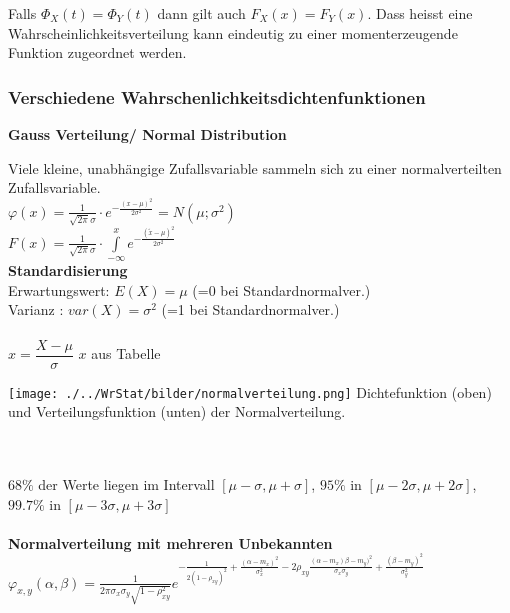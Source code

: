 		Falls $\Phi_X(t) = \Phi_Y(t)$ dann gilt auch $F_X(x)=F_Y(x)$. Dass heisst eine Wahrscheinlichkeitsverteilung kann eindeutig zu einer momenterzeugende Funktion zugeordnet werden.
		
		
			
	\subsubsection{Verschiedene Wahrschenlichkeitsdichtenfunktionen}
		\textbf{Gauss Verteilung/ Normal Distribution}\\
 		\begin{minipage}{10cm}
		Viele kleine, unabhängige Zufallsvariable sammeln sich zu einer
		normalverteilten Zufallsvariable.\\
		 $\varphi(x)=\frac{1}{\sqrt{2
		\pi}\sigma}\cdot e^{-\frac{(x-\mu)^2}{2\sigma^2}} = N(\mu ; \sigma^2) $\\ 
		$F(x)=\frac{1}{\sqrt{2
		\pi}\sigma}\cdot \int\limits^{x}_{-\infty}{e^{-\frac{(\tilde{x} -\mu)^2}{2\sigma^2}}} $ \\
		\textbf{Standardisierung}\\
		Erwartungswert: $E(X)=\mu$ \hspace{4mm}(=0 bei Standardnormalver.)\\ 
		Varianz \hspace{11.5mm}: $var(X)=\sigma^2$ (=1 bei Standardnormalver.)\\ \\
		$x=\dfrac{X-\mu}{\sigma}$ \hspace{5mm} $x$ aus Tabelle
		\end{minipage}
		\hspace{5mm}
		\begin{minipage}{7.5cm}
		\texttt{[image: ./../WrStat/bilder/normalverteilung.png]}
		Dichtefunktion (oben) und Verteilungsfunktion (unten) der Normalverteilung. 
   		\end{minipage} \\ \\
		$ 68\% $ der Werte liegen im Intervall $[ \mu - \sigma, \mu + \sigma]$, 
		$95\% $ in $[ \mu - 2\sigma, \mu + 2\sigma]$, 	
		$99.7\% $ in $[ \mu - 3\sigma, \mu + 3\sigma]$\\\\
		\textbf{ Normalverteilung mit mehreren Unbekannten}\\
		$\varphi_{x,y}(\alpha,\beta)=\frac{1}{2\pi \sigma_x \sigma_y \sqrt{1-\rho_{xy}^2}}
			e^{-\frac{1}{2(1-\rho_{xy})^2} + \frac{(\alpha - m_x)^2}{\sigma_x^2} 
			- 2\rho_{xy}\frac{(\alpha - m_x)\beta - m_y)^2}{\sigma_x \sigma_y} + \frac{(\beta - m_y)^2}{\sigma_y^2}}$\\
